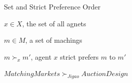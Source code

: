 \documentclass{beamer}
\begin{document}
\begin{frame}{Set and Strict Preference Order}
	\begin{description}[leftmargin=!,labelwidth=\widthof{\bfseries strict preference order}]
		\item [\emph{Agent}]$x \in X$, the set of all agnets
		\item [\emph{Matching}] $m \in M$, a set of machings
		\item [\emph{Strict Preference Order}] $m \succ_x m'$, agent $x$ strict prefers $m$ to $m'$
	\end{description}
	\pause
	\begin{center}
		$Matching Markets \succ_{Jigao} Auction Design$
	\end{center}
\end{frame}



\end{document}
